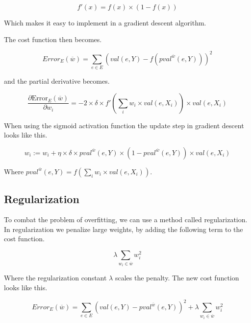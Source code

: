 $$f'(x) = f(x) \times (1-f(x))$$

Which makes it easy to implement in a gradient descent algorithm.

The cost function then becomes.

$$Error_E(\overline{w}) = \sum_{e \in E} (val(e,Y)-f(pval^{\overline{w}}(e,Y)))^2$$ 

and the partial derivative becomes.

$$\frac{\partial \text{Error}_E(\overline{w})}{\partial w_i} 
	= -2 \times \delta \times f'(\sum_i w_i \times val(e,X_i)) \times val(e,X_i)$$

When using the sigmoid activation function the update step in gradient descent looks like this.

$$w_i := w_i + \eta \times \delta \times pval^{\overline{w}}(e,Y) \times (1 - pval^{\overline{w}}(e,Y)) \times val(e,X_i)$$

Where $pval^{\overline{w}}(e,Y) = f(\sum_i w_i \times val(e,X_i))$.  


\begin{flushright}
\cite[p. 306-307]{AI2010}
\end{flushright}


\subsection{Regularization}
To combat the problem of overfitting, we can use a method called regularization.
In regularization we penalize large weights, by adding the following term to the cost function.


$$\lambda \sum_{w_i \in \overline{w}} w_i^2$$

Where the regularization constant $\lambda$ scales the penalty. 
The new cost function looks like this.

$$Error_E(\overline{w}) = \sum_{e \in E} (val(e,Y) - pval^{\overline{w}}(e,Y))^2 + \lambda \sum_{w_i \in \overline{w}} w_i^2$$


\begin{flushright}
\cite[online course]{courseraAI}
\end{flushright}













